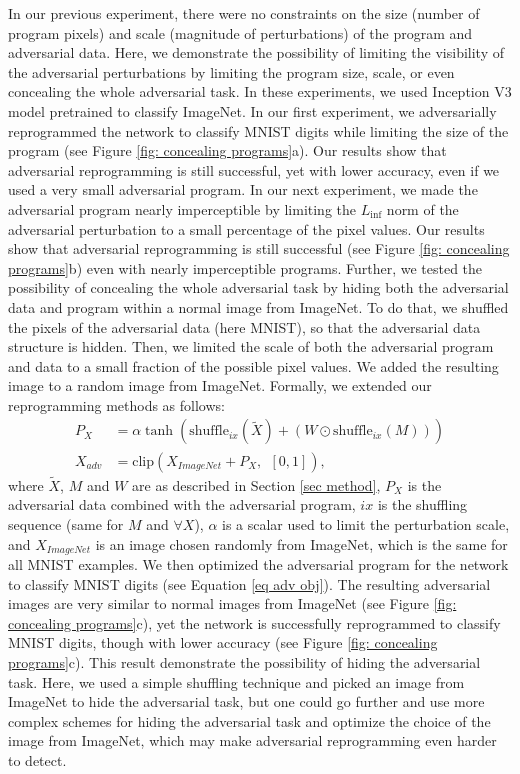 \documentclass{article}
\begin{document}
In our previous experiment, there were no constraints on the size (number of program pixels) and scale (magnitude of perturbations) of the program and adversarial data. Here, we demonstrate the possibility of limiting the visibility of the adversarial perturbations by limiting the program size, scale, or even concealing the whole adversarial task. In these experiments, we used Inception V3 model pretrained to classify ImageNet. In our first experiment, we adversarially reprogrammed the network to classify MNIST digits while limiting the size of the program (see Figure \ref{fig: concealing programs}a). Our results show that adversarial reprogramming is still successful, yet with lower accuracy, even if we used a very small adversarial program. In our next experiment, we made the adversarial program nearly imperceptible by limiting the $L_{\inf}$ norm of the adversarial perturbation to a small percentage of the pixel values. Our results show that adversarial reprogramming is still successful (see Figure \ref{fig: concealing programs}b) even with nearly imperceptible programs. Further, we tested the possibility of concealing the whole adversarial task by hiding both the adversarial data and program within a normal image from ImageNet. To do that, we shuffled the pixels of the adversarial data (here MNIST), so that the adversarial data structure is hidden. Then, we limited the scale of both the adversarial program and data to a small fraction of the possible pixel values. We added the resulting image to a random image from ImageNet. Formally, we extended our reprogramming methods as follows:
\begin{align}
P_X &= \alpha \tanh\left(\text{shuffle}_{ix}(\tilde X) + (W \odot \text{shuffle}_{ix}(M)) \right) \\
X_{adv} &= \text{clip}\left(X_{ImageNet} +P_X, ~~[0, 1] \right)
,
\end{align}
where $\tilde X$, $M$ and $W$ are as described in Section \ref{sec method}, $P_X$ is the adversarial data combined with the adversarial program, $ix$ is the shuffling sequence (same for $M$ and $\forall X$), $\alpha$ is a scalar used to limit the perturbation scale, and $X_{ImageNet}$ is an image chosen randomly from ImageNet, which is the same for all MNIST examples. We then optimized the adversarial program for the network to classify MNIST digits (see Equation \ref{eq adv obj}). The resulting adversarial images are very similar to normal images from ImageNet (see Figure \ref{fig: concealing programs}c), yet the network is successfully reprogrammed to classify MNIST digits, though with lower accuracy (see Figure \ref{fig: concealing programs}c). This result demonstrate the possibility of hiding the adversarial task. Here, we used a simple shuffling technique and picked an image from ImageNet to hide the adversarial task, but one could go further and use more complex schemes for hiding the adversarial task and optimize the choice of the image from ImageNet, which may make adversarial reprogramming even harder to detect.
\end{document}
